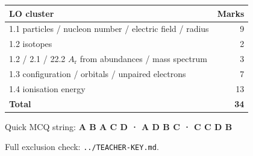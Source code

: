 \documentclass[10pt,a4paper]{article}
\begin{document}
\vspace{0.1em}
{\small
\begin{tabular}{@{}lr@{}}
\toprule
\textbf{LO cluster} & \textbf{Marks} \\
\midrule
1.1 particles / nucleon number / electric field / radius & 9 \\
1.2 isotopes & 2 \\
1.2 / 2.1 / 22.2 $A_\mathrm{r}$ from abundances / mass spectrum & 3 \\
1.3 configuration / orbitals / unpaired electrons & 7 \\
1.4 ionisation energy & 13 \\
\midrule
\textbf{Total} & \textbf{34} \\
\bottomrule
\end{tabular}}

\vspace{0.25em}
{\small Quick MCQ string: \textbf{A B A C D · A D B C · C C D B}}

{\small Full exclusion check: \texttt{../TEACHER-KEY.md}.}
\end{document}
